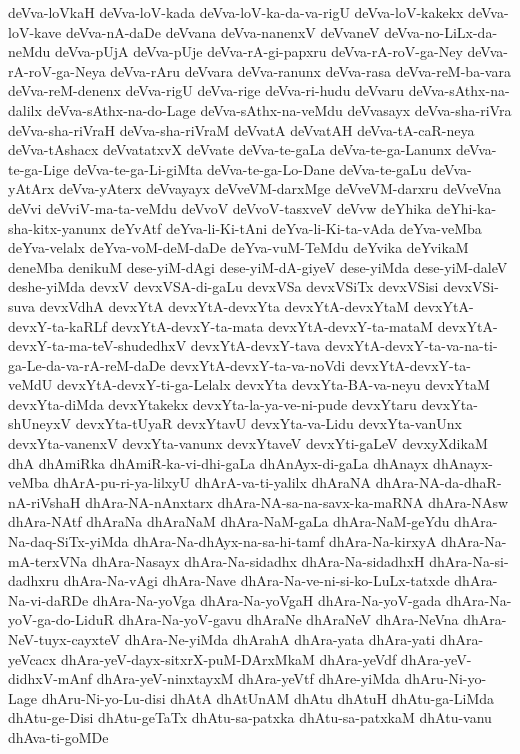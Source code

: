{deVva-loVkaH
deVva-loV-kada
deVva-loV-ka-da-va-rigU
deVva-loV-kakekx
deVva-loV-kave
deVva-nA-daDe
deVvana
deVva-nanenxV
deVvaneV
deVva-no-LiLx-da-neMdu
deVva-pUjA
deVva-pUje
deVva-rA-gi-papxru
deVva-rA-roV-ga-Ney
deVva-rA-roV-ga-Neya
deVva-rAru
deVvara
deVva-ranunx
deVva-rasa
deVva-reM-ba-vara
deVva-reM-denenx
deVva-rigU
deVva-rige
deVva-ri-hudu
deVvaru
deVva-sAthx-na-dalilx
deVva-sAthx-na-do-Lage
deVva-sAthx-na-veMdu
deVvasayx
deVva-sha-riVra
deVva-sha-riVraH
deVva-sha-riVraM
deVvatA
deVvatAH
deVva-tA-caR-neya
deVva-tAshacx
deVvatatxvX
deVvate
deVva-te-gaLa
deVva-te-ga-Lanunx
deVva-te-ga-Lige
deVva-te-ga-Li-giMta
deVva-te-ga-Lo-Dane
deVva-te-gaLu
deVva-yAtArx
deVva-yAterx
deVvayayx
deVveVM-darxMge
deVveVM-darxru
deVveVna
deVvi
deVviV-ma-ta-veMdu
deVvoV
deVvoV-tasxveV
deVvw
deYhika
deYhi-ka-sha-kitx-yanunx
deYvAtf
deYva-li-Ki-tAni
deYva-li-Ki-ta-vAda
deYva-veMba
deYva-velalx
deYva-voM-deM-daDe
deYva-vuM-TeMdu
deYvika
deYvikaM
deneMba
denikuM
dese-yiM-dAgi
dese-yiM-dA-giyeV
dese-yiMda
dese-yiM-daleV
deshe-yiMda
devxV
devxVSA-di-gaLu
devxVSa
devxVSiTx
devxVSisi
devxVSi-suva
devxVdhA
devxYtA
devxYtA-devxYta
devxYtA-devxYtaM
devxYtA-devxY-ta-kaRLf
devxYtA-devxY-ta-mata
devxYtA-devxY-ta-mataM
devxYtA-devxY-ta-ma-teV-shudedhxV
devxYtA-devxY-tava
devxYtA-devxY-ta-va-na-ti-ga-Le-da-va-rA-reM-daDe
devxYtA-devxY-ta-va-noVdi
devxYtA-devxY-ta-veMdU
devxYtA-devxY-ti-ga-Lelalx
devxYta
devxYta-BA-va-neyu
devxYtaM
devxYta-diMda
devxYtakekx
devxYta-la-ya-ve-ni-pude
devxYtaru
devxYta-shUneyxV
devxYta-tUyaR
devxYtavU
devxYta-va-Lidu
devxYta-vanUnx
devxYta-vanenxV
devxYta-vanunx
devxYtaveV
devxYti-gaLeV
devxyXdikaM
dhA
dhAmiRka
dhAmiR-ka-vi-dhi-gaLa
dhAnAyx-di-gaLa
dhAnayx
dhAnayx-veMba
dhArA-pu-ri-ya-lilxyU
dhArA-va-ti-yalilx
dhAraNA
dhAra-NA-da-dhaR-nA-riVshaH
dhAra-NA-nAnxtarx
dhAra-NA-sa-na-savx-ka-maRNA
dhAra-NAsw
dhAra-NAtf
dhAraNa
dhAraNaM
dhAra-NaM-gaLa
dhAra-NaM-geYdu
dhAra-Na-daq-SiTx-yiMda
dhAra-Na-dhAyx-na-sa-hi-tamf
dhAra-Na-kirxyA
dhAra-Na-mA-terxVNa
dhAra-Nasayx
dhAra-Na-sidadhx
dhAra-Na-sidadhxH
dhAra-Na-si-dadhxru
dhAra-Na-vAgi
dhAra-Nave
dhAra-Na-ve-ni-si-ko-LuLx-tatxde
dhAra-Na-vi-daRDe
dhAra-Na-yoVga
dhAra-Na-yoVgaH
dhAra-Na-yoV-gada
dhAra-Na-yoV-ga-do-LiduR
dhAra-Na-yoV-gavu
dhAraNe
dhAraNeV
dhAra-NeVna
dhAra-NeV-tuyx-cayxteV
dhAra-Ne-yiMda
dhArahA
dhAra-yata
dhAra-yati
dhAra-yeVcacx
dhAra-yeV-dayx-sitxrX-puM-DArxMkaM
dhAra-yeVdf
dhAra-yeV-didhxV-mAnf
dhAra-yeV-ninxtayxM
dhAra-yeVtf
dhAre-yiMda
dhAru-Ni-yo-Lage
dhAru-Ni-yo-Lu-disi
dhAtA
dhAtUnAM
dhAtu
dhAtuH
dhAtu-ga-LiMda
dhAtu-ge-Disi
dhAtu-geTaTx
dhAtu-sa-patxka
dhAtu-sa-patxkaM
dhAtu-vanu
dhAva-ti-goMDe
}
